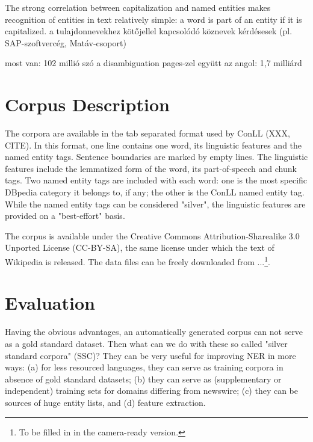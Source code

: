 \documentclass[11pt]{article}
\begin{document}
The strong correlation between capitalization and named entities makes recognition of entities in text relatively simple: a word is part of an entity if it is capitalized.
a tulajdonnevekhez kötőjellel kapcsolódó köznevek kérdésesek (pl. SAP-szoftvercég, Matáv-csoport)

most van: 102 millió szó a disambiguation pages-zel együtt
az angol: 1,7 milliárd


\section{Corpus Description}


The corpora are available in the tab separated format used by ConLL (XXX, CITE). In this format, one line contains one word, its linguistic features and the named entity tags. Sentence boundaries are marked by empty lines. The linguistic features include the lemmatized form of the word, its part-of-speech and chunk tags. Two named entity tags are included with each word: one is the most specific DBpedia category it belongs to, if any; the other is the ConLL named entity tag. While the named entity tags can be considered "silver", the linguistic features are provided on a "best-effort" basis.

The corpus is available under the Creative Commons Attribution-Sharealike 3.0 Unported License (CC-BY-SA), the same license under which the text of Wikipedia is released. The data files can be freely downloaded from ...\footnote{To be filled in in the camera-ready version.}.


\section{Evaluation}


Having the obvious advantages, an automatically generated corpus can not serve as a gold standard dataset. Then what can we do with these so called "silver standard corpora" (SSC)? They can be very useful for improving NER in more ways: (a) for less resourced languages, they can serve as training corpora in absence of gold standard datasets; (b) they can serve as (supplementary or independent) training sets for domains differing from newswire; (c) they can be sources of huge entity lists, and (d) feature extraction. 
\end{document}
